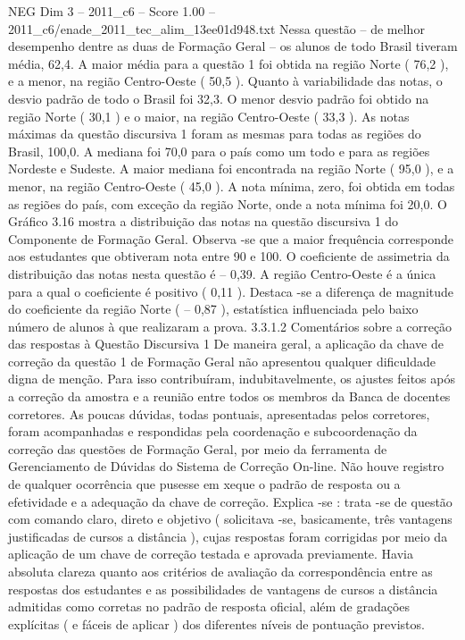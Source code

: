 \begin{textsample}{NEG Dim 3 – 2011\_c6 – Score 1.00 – 2011\_c6/enade\_2011\_tec\_alim\_13ee01d948.txt}
Nessa questão – de melhor desempenho dentre as duas de Formação Geral – os alunos de todo Brasil tiveram média, 62,4.
A maior média para a questão 1 foi obtida na região Norte ( 76,2 ), e a menor, na região Centro-Oeste ( 50,5 ).
Quanto à variabilidade das notas, o desvio padrão de todo o Brasil foi 32,3.
O menor desvio padrão foi obtido na região Norte ( 30,1 ) e o maior, na região Centro-Oeste ( 33,3 ).
As notas máximas da questão discursiva 1 foram as mesmas para todas as regiões do Brasil, 100,0.
A mediana foi 70,0 para o país como um todo e para as regiões Nordeste e Sudeste.
A maior mediana foi encontrada na região Norte ( 95,0 ), e a menor, na região Centro-Oeste ( 45,0 ).
A nota mínima, zero, foi obtida em todas as regiões do país, com exceção da região Norte, onde a nota mínima foi 20,0.
O Gráfico 3.16 mostra a distribuição das notas na questão discursiva 1 do Componente de Formação Geral.
Observa -se que a maior frequência corresponde aos estudantes que obtiveram nota entre 90 e 100.
O coeficiente de assimetria da distribuição das notas nesta questão é – 0,39.
A região Centro-Oeste é a única para a qual o coeficiente é positivo ( 0,11 ).
Destaca -se a diferença de magnitude do coeficiente da região Norte ( – 0,87 ), estatística influenciada pelo baixo número de alunos à que realizaram a prova. 3.3.1.2 Comentários sobre a correção das respostas à Questão Discursiva 1 De maneira geral, a aplicação da chave de correção da questão 1 de Formação Geral não apresentou qualquer dificuldade digna de menção.
Para isso contribuíram, indubitavelmente, os ajustes feitos após a correção da amostra e a reunião entre todos os membros da Banca de docentes corretores.
As poucas dúvidas, todas pontuais, apresentadas pelos corretores, foram acompanhadas e respondidas pela coordenação e subcoordenação da correção das questões de Formação Geral, por meio da ferramenta de Gerenciamento de Dúvidas do Sistema de Correção On-line.
Não houve registro de qualquer ocorrência que pusesse em xeque o padrão de resposta ou a efetividade e a adequação da chave de correção.
Explica -se : trata -se de questão com comando claro, direto e objetivo ( solicitava -se, basicamente, três vantagens justificadas de cursos a distância ), cujas respostas foram corrigidas por meio da aplicação de um chave de correção testada e aprovada previamente.
Havia absoluta clareza quanto aos critérios de avaliação da correspondência entre as respostas dos estudantes e as possibilidades de vantagens de cursos a distância admitidas como corretas no padrão de resposta oficial, além de gradações explícitas ( e fáceis de aplicar ) dos diferentes níveis de pontuação previstos.

\end{textsample}
